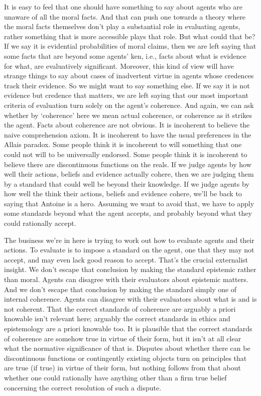 \documentclass[
  10pt,
  letterpaper,
  twoside]{scrbook}
\begin{document}
It is easy to feel that one should have something to say about agents
who are unaware of all the moral facts. And that can push one towards a
theory where the moral facts themselves don't play a substantial role in
evaluating agents, rather something that is more accessible plays that
role. But what could that be? If we say it is evidential probabilities
of moral claims, then we are left saying that some facts that are beyond
some agents' ken, i.e., facts about what is evidence for what, are
evaluatively significant. Moreover, this kind of view will have strange
things to say about cases of inadvertent virtue in agents whose
credences track their evidence. So we might want to say something else.
If we say it is not evidence but credence that matters, we are left
saying that our most important criteria of evaluation turn solely on the
agent's coherence. And again, we can ask whether by `coherence' here we
mean actual coherence, or coherence as it strikes the agent. Facts about
coherence are not obvious. It is incoherent to believe the naive
comprehension axiom. It is incoherent to have the usual preferences in
the Allais paradox. Some people think it is incoherent to will something
that one could not will to be universally endorsed. Some people think it
is incoherent to believe there are discontinuous functions on the reals.
If we judge agents by how well their actions, beliefs and evidence
actually cohere, then we are judging them by a standard that could well
be beyond their knowledge. If we judge agents by how well the think
their actions, beliefs and evidence cohere, we'll be back to saying that
{Antoine} is a hero. Assuming we want to avoid that, we have to apply
some standards beyond what the agent accepts, and probably beyond what
they could rationally accept.

The business we're in here is trying to work out how to evaluate agents
and their actions. To evaluate is to impose a standard on the agent, one
that they may not accept, and may even lack good reason to accept.
That's the crucial externalist insight. We don't escape that conclusion
by making the standard epistemic rather than moral. Agents can disagree
with their evaluators about epistemic matters. And we don't escape that
conclusion by making the standard simply one of internal coherence.
Agents can disagree with their evaluators about what is and is not
coherent. That the correct standards of coherence are arguably a priori
knowable isn't relevant here; arguably the correct standards in ethics
and epistemology are a priori knowable too. It is plausible that the
correct standards of coherence are somehow true in virtue of their form,
but it isn't at all clear what the normative significance of that is.
Disputes about whether there can be discontinuous functions or
contingently existing objects turn on principles that are true (if true)
in virtue of their form, but nothing follows from that about whether one
could rationally have anything other than a firm true belief concerning
the correct resolution of such a dispute.
\end{document}
